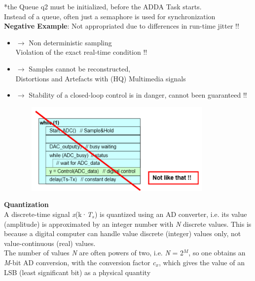 *the Queue q2 must be initialized, before the ADDA Task starts.\\

Instead of a queue, often just a semaphore is used for synchronization \\

\textbf{Negative Example}: Not appropriated due to differences in run-time  jitter !!

\begin{itemize}
\item $\rightarrow$ Non deterministic sampling \\ Violation of the exact real-time condition !!
\item $\rightarrow$ Samples cannot be reconstructed, \\ Distortions and Artefacts with (HQ) Multimedia signals
\item $\rightarrow$ Stability of a closed-loop control is in danger, cannot been guaranteed !!
\end{itemize}

    \begin{figure}[h]
    \centering
    \includegraphics[width=10cm, height=4.5cm]{Images/image184.png}
    \label{fig:Fig 92}
    \end{figure}
\newpage
{\rot\bf Quantization}\\

A discrete-time signal \textit{x}(k·\textit{T${}_{s}$}) is quantized using an AD converter, i.e. its value (amplitude) is approximated by an integer number with \textit{N} discrete values. This is because a digital computer can handle value discrete (integer) values only, not value-continuous (real) values.\\

The number of values \textit{N} are often powers of two, i.e. \textit{N} = 2\textit{${}^{M}$}, so one obtains an \textit{M}-bit AD conversion, with the conversion factor \textit{c${}_{x}$}, which gives the value of an LSB (least significant bit) as a physical quantity\\

